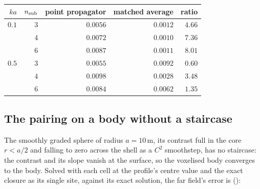 \documentclass[11pt,a4paper]{article}
\begin{document}
\begin{center}
\begin{tabular}{@{}rrrrr@{}}
\toprule
$ka$ & $n_{\rm sub}$ & point propagator & matched average & ratio\\
\midrule
$0.1$ & $3$ & $0.0056$ & $\mathbf{0.0012}$ & $4.66$\\
      & $4$ & $0.0072$ & $\mathbf{0.0010}$ & $7.36$\\
      & $6$ & $0.0087$ & $\mathbf{0.0011}$ & $8.01$\\
\midrule
$0.5$ & $3$ & $\mathbf{0.0055}$ & $0.0092$ & $0.60$\\
      & $4$ & $0.0098$ & $\mathbf{0.0028}$ & $3.48$\\
      & $6$ & $0.0084$ & $\mathbf{0.0062}$ & $1.35$\\
\bottomrule
\end{tabular}
\end{center}

\subsection{The pairing on a body without a staircase}

The smoothly graded sphere of radius $a = 10$\,m, its contrast full in the core
$r < a/2$ and falling to zero across the shell as a $C^2$ smoothstep, has no
staircase: the contrast and its slope vanish at the surface, so the voxelised
body converges to the body.  Solved with each cell at the profile's centre value
and the exact closure as its single site, against its exact solution, the far
field's error is ():
\end{document}
